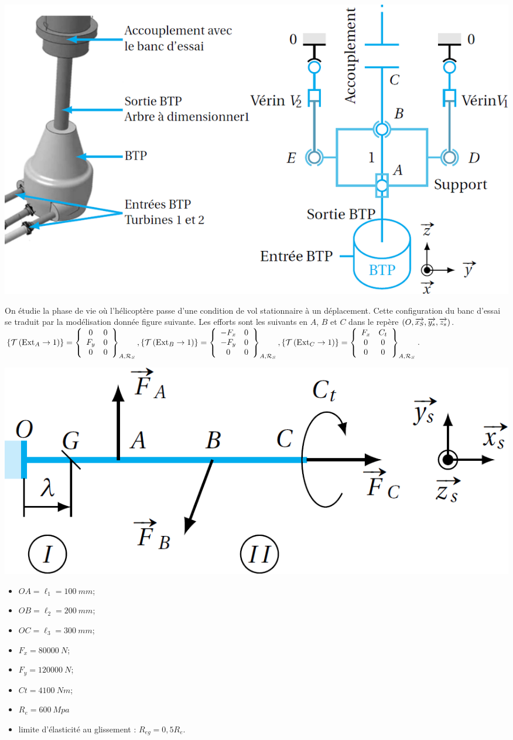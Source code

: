 \documentclass[10pt,fleqn]{article} %
\begin{document}
\begin{multicols}{2}
\begin{center}
\includegraphics[width=\linewidth]{images/fig_04}
\end{center}

On étudie la phase de vie où l’hélicoptère passe d’une condition de vol stationnaire
à un déplacement. Cette configuration du banc d’essai se traduit par la modélisation
donnée figure suivante. Les efforts sont les suivants en $A$, $B$ et $C$ dans le repère $\repere{O}{x_S}{y_s}{z_s}$.
$
\torseurstat{T}{\text{Ext}_A}{1} = \torseurcol{0}{F_y}{0}{0}{0}{0}{A,\mathcal{R}_S}, 
\torseurstat{T}{\text{Ext}_B}{1} = \torseurcol{-F_x}{-F_y}{0}{0}{0}{0}{A,\mathcal{R}_S}, 
\torseurstat{T}{\text{Ext}_C}{1} = \torseurcol{F_x}{0}{0}{C_t}{0}{0}{A,\mathcal{R}_S}
$.

\begin{center}
\includegraphics[width=\linewidth]{images/fig_05}
\end{center}

\begin{multicols}{2}
\begin{itemize}
\item $OA = \ell_1 = \SI{100}{mm}$;
\item $OB = \ell_2 = \SI{200}{mm}$;
\item $OC = \ell_3 = \SI{300}{mm}$;
\item $F_x = \SI{80000}{N}$; 
\item $F_y = \SI{120000}{N}$;
\item $Ct = \SI{4100}{Nm}$;
\item $R_e = \SI{600}{Mpa}$ 
\item limite d’élasticité au glissement : $R_{eg} = 0,5R_e$.
\end{itemize}
\end{multicols}



\end{multicols}
\end{document}
